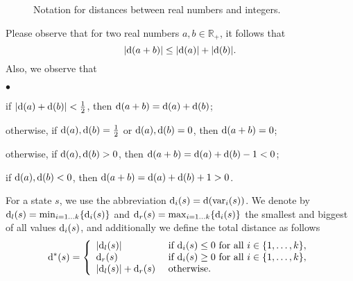 \documentclass[fleqn,envcountsame]{LMCS}
\newcommand{\setR}{\ensuremath{\mathbb{R}}}
\newcommand{\floor}[1]{\ensuremath{\lfloor #1 \rfloor}}
\newcommand{\ceil}[1]{\ensuremath{\lceil #1 \rceil}}
\newcommand{\dleft}{\ensuremath{\mathrm{d}_l}}
\newcommand{\dright}{\ensuremath{\mathrm{d}_r}}
\renewcommand{\max}{\mathrm{max}}
\begin{document}
\begin{figure}[h]
\begin{center}
\end{center}
\caption{Notation for distances between real numbers and integers.}
\label{fig-dist}
\end{figure}

Please observe that for two real numbers $a,b \in \setR_+$,
it follows that
\[ |\mathrm{d}(a + b)| \leq |\mathrm{d}(a)| + |\mathrm{d}(b)|.\]
Also, we observe that 
\begin{iteMize}{$\bullet$}
\item if $|\mathrm{d}(a) + \mathrm{d}(b)|< \frac 1 2$, then $\mathrm{d}(a + b) = \mathrm{d}(a) + \mathrm{d}(b)$;
\item otherwise, if  $\mathrm{d}(a),\mathrm{d}(b) = \frac 1 2$ or $\mathrm{d}(a),\mathrm{d}(b)=0$, then $\mathrm{d}(a + b)=0$;
\item otherwise, if $\mathrm{d}(a),\mathrm{d}(b)>0$, then $\mathrm{d}(a + b) = \mathrm{d}(a) + \mathrm{d}(b) - 1 < 0$;
\item if $\mathrm{d}(a),\mathrm{d}(b)<0$, then $\mathrm{d}(a + b) = \mathrm{d}(a) + \mathrm{d}(b) + 1 > 0$.
\end{iteMize}


For a state $s$, we use the abbreviation $\mathrm{d}_i(s) = \mathrm{d}(\mathrm{var}_i(s))$.
We denote by $\dleft(s)= \min_{i=1 \ldots k}\{\di_i(s)\}$ and
$\dright(s)= \max_{i=1 \ldots k}\{\di_i(s)\}$ the smallest and biggest
of all values $\mathrm{d}_i(s)$, and additionally we define the total distance
as follows
\begin{displaymath} \label{max-total-dist}
\dih(s) = \left\{
\begin{array}{ll} 
|\dleft(s)| & 
    \text{ if } \di_i (s)\leq 0 \text{ for all } i \in \{1, \ldots, k\},\\
\dright(s) & 
    \text{ if } \di_i(s) \geq 0 \text{ for all } i \in \{1, \ldots, k\},\\
|\dleft(s)|+ \dright(s) & 
    \text{ otherwise.}
\end{array} \right.
\end{displaymath}
\end{document}
